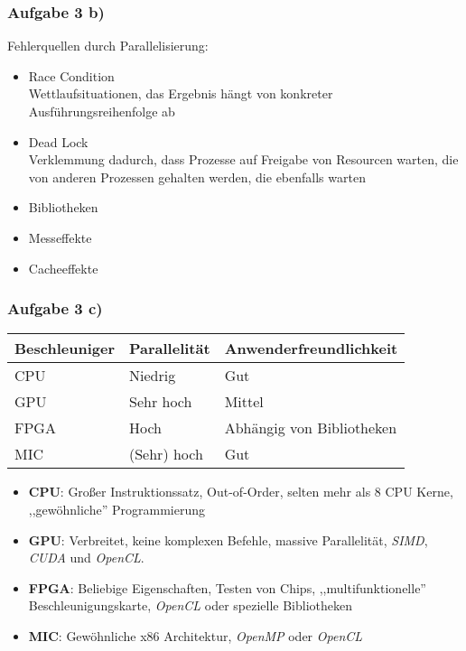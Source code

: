 \documentclass[german,notes,18pt]{beamer}
\begin{document}
	\begin{frame}
		\frametitle{Aufgabe 3 b)}
		
		Fehlerquellen durch Parallelisierung:
		\begin{itemize}
			\item Race Condition \\
			Wettlaufsituationen, das Ergebnis hängt von konkreter Ausführungsreihenfolge ab
			\item Dead Lock \\
			Verklemmung dadurch, dass Prozesse auf Freigabe von Resourcen warten, die von anderen Prozessen gehalten werden, die ebenfalls warten
			\item Bibliotheken
			\item Messeffekte
			\item Cacheeffekte
		\end{itemize}
	\end{frame}
	
	\begin{frame}
		\frametitle{Aufgabe 3 c)}
		
		\begin{table}
			\centering
			\begin{tabular}{l | p{3.5cm} p{4.5cm}}
				Beschleuniger & Parallelität & Anwenderfreundlichkeit \\
				\hline
				CPU & Niedrig & Gut \\
				GPU & Sehr hoch & Mittel \\
				FPGA & Hoch & Abhängig von Bibliotheken \\
				MIC & (Sehr) hoch & Gut
			\end{tabular}
		\end{table}
	
	\begin{itemize}
		\item \textbf{CPU}:
		Großer Instruktionssatz, Out-of-Order, selten mehr als 8 CPU Kerne, ,,gewöhnliche'' Programmierung
		
		\item \textbf{GPU}:
		Verbreitet, keine komplexen Befehle, massive Parallelität, \emph{SIMD}, \emph{CUDA} und \emph{OpenCL}.
		
		\item \textbf{FPGA}:
		Beliebige Eigenschaften, Testen von Chips, ,,multifunktionelle'' Beschleunigungskarte, \emph{OpenCL} oder spezielle Bibliotheken
		
		\item \textbf{MIC}:
		Gewöhnliche x86 Architektur, \emph{OpenMP} oder \emph{OpenCL}
	\end{itemize}
	\end{frame}
\end{document}
